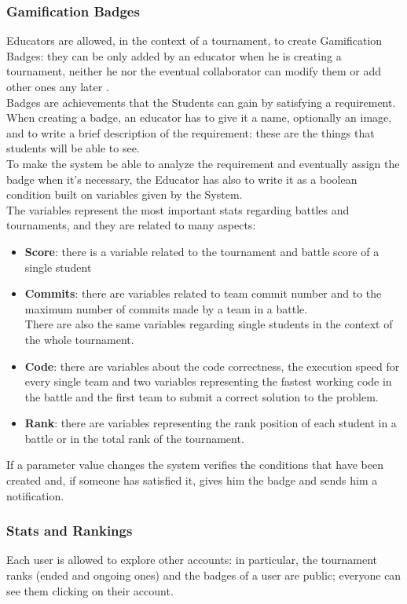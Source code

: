 \documentclass{article}
\begin{document}
\subsubsection{Gamification Badges}
Educators are allowed, in the context of a tournament, to create Gamification Badges: they can be only added by an educator when he is creating a tournament, neither he nor the eventual collaborator can modify them or add other ones any later .\\
Badges are achievements that the Students can gain by satisfying a requirement.\\
When creating a badge, an educator has to give it a name, optionally an image, and to write a brief description of the requirement: these are the things that students will be able to see.\\
To make the system be able to analyze the requirement and eventually assign the badge when it's necessary, the Educator has also to write it as a boolean condition built on variables given by the System.\\
The variables represent the most important stats regarding battles and tournaments, and they are related to many aspects:\\
\begin{itemize}
    \item \textbf{Score}: there is a variable related to the tournament and battle score of a single student 
    \item \textbf{Commits}: there are variables related to team commit number and to the maximum number of commits made by a team in a battle.\\
    There are also the same variables regarding single students in the context of the whole tournament.
    \item \textbf{Code}: there are variables about the code correctness, the execution speed for every single team and two variables representing the fastest working code in the battle and the first team to submit a correct solution to the problem.
    \item \textbf{Rank}: there are variables representing the rank position of each student in a battle 
    or in the total rank of the tournament.
\end{itemize}
If a parameter value changes the system verifies the conditions that have been created and, if someone has satisfied it, gives him the badge and sends him a notification.
\subsubsection{Stats and Rankings}
Each user is allowed to explore other accounts: in particular, the tournament ranks (ended and ongoing ones) and the badges of a user are public; everyone can see them clicking on their account.
\end{document}
